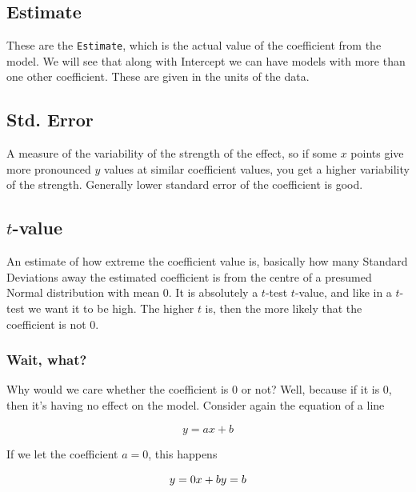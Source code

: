 \documentclass[
]{book}
\begin{document}
\hypertarget{estimate}{%
\subsection{Estimate}\label{estimate}}

These are the \texttt{Estimate}, which is the actual value of the coefficient from the model. We will see that along with Intercept we can have models with more than one other coefficient. These are given in the units of the data.

\hypertarget{std.-error}{%
\subsection{Std. Error}\label{std.-error}}

A measure of the variability of the strength of the effect, so if some \(x\) points give more pronounced \(y\) values at similar coefficient values, you get a higher variability of the strength. Generally lower standard error of the coefficient is good.

\hypertarget{t-value}{%
\subsection{\texorpdfstring{\(t\)-value}{t-value}}\label{t-value}}

An estimate of how extreme the coefficient value is, basically how many Standard Deviations away the estimated coefficient is from the centre of a presumed Normal distribution with mean 0. It is absolutely a \(t\)-test \(t\)-value, and like in a \(t\)-test we want it to be high. The higher \(t\) is, then the more likely that the coefficient is not 0.

\hypertarget{wait-what}{%
\subsubsection{Wait, what?}\label{wait-what}}

Why would we care whether the coefficient is 0 or not? Well, because if it is 0, then it's having no effect on the model. Consider again the equation of a line

\begin{equation}
y = ax + b
\end{equation}

If we let the coefficient \(a = 0\), this happens

\begin{equation}
y = 0 x + b\\
y = b
\end{equation}
\end{document}
